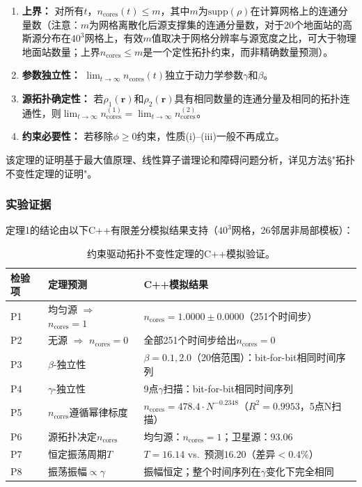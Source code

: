 \documentclass[sn-nature,pdflatex]{sn-jnl}
\begin{document}
\begin{enumerate}
  \item[(i)] \textbf{上界：} 对所有$t$，$n_{\text{cores}}(t) \le m$，其中$m$为$\text{supp}(\rho)$在计算网格上的连通分量数（注意：$m$为网格离散化后源支撑集的连通分量数，对于20个地面站的高斯源分布在$40^3$网格上，有效$m$值取决于网格分辨率与源宽度之比，可大于物理地面站数量；上界$n_{\text{cores}} \le m$是一个定性拓扑约束，而非精确数量预测）。
  \item[(ii)] \textbf{参数独立性：} $\lim_{t \to \infty} n_{\text{cores}}(t)$独立于动力学参数$\gamma$和$\beta$。
  \item[(iii)] \textbf{源拓扑确定性：} 若$\rho_1(\mathbf{r})$和$\rho_2(\mathbf{r})$具有相同数量的连通分量及相同的拓扑连通性，则$\lim_{t \to \infty} n_{\text{cores}}^{(1)} = \lim_{t \to \infty} n_{\text{cores}}^{(2)}$。
  \item[(iv)] \textbf{约束必要性：} 若移除$\phi \ge 0$约束，性质(i)--(iii)一般不再成立。
\end{enumerate}

该定理的证明基于最大值原理、线性算子谱理论和障碍问题分析，详见方法§"拓扑不变性定理的证明"。

\subsubsection{实验证据}

定理1的结论由以下C++有限差分模拟结果支持（$40^3$网格，26邻居非局部模板）：

\begin{table}[htbp]
\centering
\caption{约束驱动拓扑不变性定理的C++模拟验证。}
\label{tab:predictions}
\begin{tabular}{lll}
\toprule
\textbf{检验项} & \textbf{定理预测} & \textbf{C++模拟结果} \\
\midrule
P1 & 均匀源 $\Rightarrow$ $n_{\text{cores}}=1$ & $n_{\text{cores}} = 1.0000 \pm 0.0000$（251个时间步） \\
P2 & 无源 $\Rightarrow$ $n_{\text{cores}}=0$ & 全部251个时间步给出$n_{\text{cores}}=0$ \\
P3 & $\beta$-独立性 & $\beta=0.1,2.0$（20倍范围）：bit-for-bit相同时间序列 \\
P4 & $\gamma$-独立性 & 9点$\gamma$扫描：bit-for-bit相同时间序列 \\
P5 & $n_{\text{cores}}$遵循幂律标度 & $n_{\text{cores}} = 478.4 \cdot N^{-0.2348}$（$R^2=0.9953$，5点N扫描） \\
P6 & 源拓扑决定$n_{\text{cores}}$ & 均匀源：$n_{\text{cores}}=1$；卫星源：$93.06$ \\
P7 & 恒定振荡周期$T$ & $T=16.14$ vs.\ 预测$16.20$（差异$<0.4\%$） \\
P8 & 振荡振幅$\propto \gamma$ & 振幅恒定；整个时间序列在$\gamma$变化下完全相同 \\
\bottomrule
\end{tabular}
\end{table}
\end{document}

